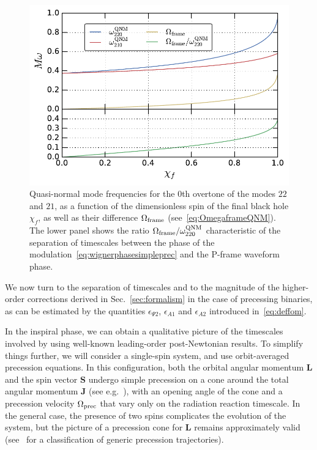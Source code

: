 \documentclass[aps,showpacs,twocolumn,
prd,superscriptaddress,nofootinbib]{revtex4-1}
\begin{document}
\begin{figure}
  \centering
  \includegraphics[width=.98\linewidth]{plots/postmergeromega_py.pdf}
  \caption{Quasi-normal mode frequencies for the 0th overtone of the modes $22$ and $21$, as a function of the dimensionless spin of the final black hole $\chi_{f}$, as well as their difference $\Omega_{\rm frame}$ (see~\eqref{eq:OmegaframeQNM}). The lower panel shows the  ratio $\Omega_{\rm frame} / \omega^{\rm QNM}_{220}$ characteristic of the separation of timescales between the phase of the modulation~\eqref{eq:wignerphasesimpleprec} and the P-frame waveform phase.}
  \label{fig:QNM}
\end{figure}

We now turn to the separation of timescales and to the magnitude of the higher-order corrections derived in Sec.~\ref{sec:formalism} in the case of precessing binaries, as can be estimated by the quantities $\epsilon_{\Psi 2}$, $\epsilon_{A1}$ and $\epsilon_{A 2}$ introduced in~\eqref{eq:deffom}.

In the inspiral phase, we can obtain a qualitative picture of the timescales involved by using well-known leading-order post-Newtonian results. To simplify things further, we will consider a single-spin system, and use orbit-averaged precession equations. In this configuration, both the orbital angular momentum $\bm{L}$ and the spin vector $\bm{S}$ undergo simple precession on a cone around the total angular momentum $\bm{J}$ (see e.g.~\cite{Apostolatos+94, Kidder95}), with an opening angle of the cone and a precession velocity $\Omega_{\rm prec}$ that vary only on the radiation reaction timescale. In the general case, the presence of two spins complicates the evolution of the system, but the picture of a precession cone for $\bm{L}$ remains approximately valid (see~\cite{Kesden+14} for a classification of generic precession trajectories).
\end{document}
